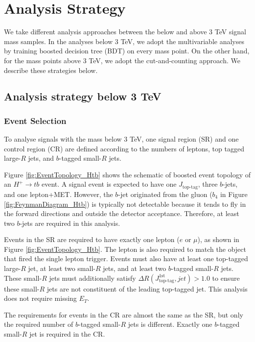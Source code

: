 \section{Analysis Strategy}
\label{sec:AnalysisStrategy}
We take different analysis approaches between the below and above 3 TeV signal mass samples. In the analyses below 3 TeV, we adopt the multivariable analyses by training boosted decision tree (BDT) on every mass point. On the other hand, for the mass points above 3 TeV, we adopt the cut-and-counting approach. We describe these strategies below.

\subsection{Analysis strategy below 3 TeV}
\label{subsec:AnaStrategyUnder3TeV}
\subsubsection{Event Selection}
\label{subsubsec:RegionDefUnder3TeV}
To analyse signals with the mass below 3 TeV, one signal region (SR) and one control region (CR) are defined according to the numbers of leptons, top tagged large-$R$ jets, and $b$-tagged small-$R$ jets. 

Figure \ref{fig:EventTopology_Htb} shows the schematic of boosted event topology of an $H^{+}{\rightarrow}tb$ event. A signal event is expected to have one $J_{\text{top-tag}}$, three $b$-jets, and one lepton+MET. However, the $b$-jet originated from the gluon ($b_{4}$ in Figure \ref{fig:FeynmanDiagram_Htb}) is typically not detectable because it tends to fly in the forward directions and outside the detector acceptance. Therefore, at least two $b$-jets are required in this analysis.

Events in the SR are required to have exactly one lepton ($e$ or ${\mu}$), as shown in Figure \ref{fig:EventTopology_Htb}. The lepton is also required to match the object that fired the single lepton trigger. Events must also have at least one top-tagged large-$R$ jet, at least two small-$R$ jets, and at least two $b$-tagged small-$R$ jets. These small-$R$ jets must additionally satisfy ${\Delta}R(J_{\text{top-tag}}^{1\text{st}}, jet)>1.0$ to ensure these small-$R$ jets are not constituent of the leading top-tagged jet. This analysis does not require missing $E_{T}$. 

The requirements for events in the CR are almost the same as the SR, but only the required number of $b$-tagged small-$R$ jets is different. Exactly one $b$-tagged small-$R$ jet is required in the CR.

